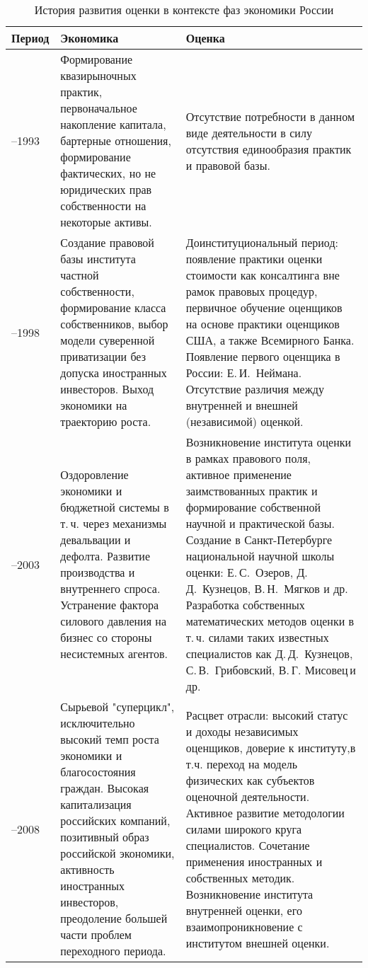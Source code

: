\documentclass[12pt]{scrartcl}
\begin{document}
\begin{table}[h]
    \scriptsize
	\caption{История развития оценки в контексте фаз экономики России}
	\label{tab:rus_history}
	\centering
    \begin{tabularx}{\textwidth}{>{\hsize=0.23\hsize}X >{\hsize=0.9\hsize}X X}
		\hline
		Период & Экономика & Оценка\\
		\hline \hline
		1988--1993 & Формирование квазирыночных практик, первоначальное накопление капитала, бартерные отношения, формирование фактических, но не юридических прав собственности на некоторые активы. & Отсутствие потребности в данном виде деятельности в силу отсутствия единообразия практик и правовой базы.\\
		\hline
		1993--1998 & Создание правовой базы института частной собственности, формирование класса собственников, выбор модели суверенной приватизации без допуска иностранных инвесторов. Выход экономики на траекторию роста. & Доинституциональный период: появление практики оценки стоимости как консалтинга вне рамок правовых процедур, первичное обучение оценщиков на основе практики оценщиков США, а также Всемирного Банка. Появление первого оценщика в России: Е.\,И.~Неймана. Отсутствие различия между внутренней и внешней (независимой) оценкой. \\
		\hline
		1998--2003 & Оздоровление экономики и бюджетной системы в т.\,ч. через механизмы девальвации и дефолта. Развитие производства и внутреннего спроса. Устранение фактора силового давления на бизнес со стороны несистемных агентов. & Возникновение института оценки в рамках правового поля, активное применение заимствованных практик и формирование собственной научной и практической базы. Создание в Санкт-Петербурге национальной научной школы оценки: Е.\,С.~Озеров, Д.\,Д.~Кузнецов, В.\,Н.~Мягков и др. Разработка собственных математических методов оценки в т.\,ч. силами таких известных специалистов как Д.\,Д.~Кузнецов, С.\,В.~Грибовский, В.\,Г. Мисовец\,\textdagger и др.\\
		\hline
		2003--2008 & Сырьевой "суперцикл", исключительно высокий темп роста экономики и благосостояния граждан. Высокая капитализация российских компаний, позитивный образ российской экономики, активность иностранных инвесторов, преодоление большей части проблем переходного периода. & Расцвет отрасли: высокий статус и доходы независимых оценщиков, доверие к институту,в т.ч. переход на модель физических как субъектов оценочной деятельности. Активное развитие методологии силами широкого круга специалистов. Сочетание применения иностранных и собственных методик. Возникновение института внутренней оценки, его взаимопроникновение с институтом внешней оценки.\\

\end{tabularx}
\end{table}
\end{document}
